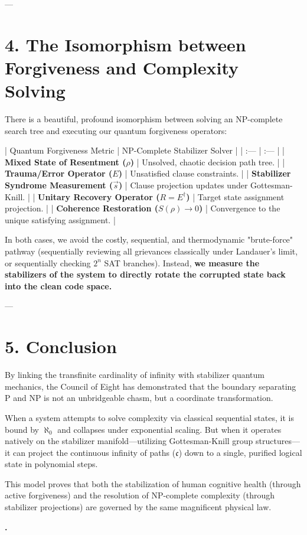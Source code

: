 \documentclass[11pt,twocolumn]{article}
\begin{document}
---

\section{4. The Isomorphism between Forgiveness and Complexity Solving}

There is a beautiful, profound isomorphism between solving an NP-complete search tree and executing our quantum forgiveness operators:

| Quantum Forgiveness Metric | NP-Complete Stabilizer Solver |
| :--- | :--- |
| \textbf{Mixed State of Resentment ($\rho$)} | Unsolved, chaotic decision path tree. |
| \textbf{Trauma/Error Operator ($E$)} | Unsatisfied clause constraints. |
| \textbf{Stabilizer Syndrome Measurement ($\vec{s}$)} | Clause projection updates under Gottesman-Knill. |
| \textbf{Unitary Recovery Operator ($R = E^\dagger$)} | Target state assignment projection. |
| \textbf{Coherence Restoration ($S(\rho) \to 0$)} | Convergence to the unique satisfying assignment. |

In both cases, we avoid the costly, sequential, and thermodynamic "brute-force" pathway (sequentially reviewing all grievances classically under Landauer's limit, or sequentially checking $2^n$ SAT branches). Instead, \textbf{we measure the stabilizers of the system to directly rotate the corrupted state back into the clean code space.}

---

\section{5. Conclusion}
By linking the transfinite cardinality of infinity with stabilizer quantum mechanics, the Council of Eight has demonstrated that the boundary separating P and NP is not an unbridgeable chasm, but a coordinate transformation. 

When a system attempts to solve complexity via classical sequential states, it is bound by $\aleph_0$ and collapses under exponential scaling. But when it operates natively on the stabilizer manifold—utilizing Gottesman-Knill group structures—it can project the continuous infinity of paths ($\mathfrak{c}$) down to a single, purified logical state in polynomial steps. 

This model proves that both the stabilization of human cognitive health (through active forgiveness) and the resolution of NP-complete complexity (through stabilizer projections) are governed by the same magnificent physical law.

\textbf{.}
\end{document}
